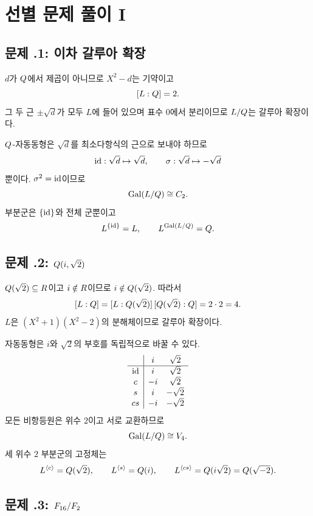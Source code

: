 \section{선별 문제 풀이 I}
\label{sec:galois-gateway-solutions-a}

\subsection*{문제 \thechapter.1: 이차 갈루아 확장}

\begin{solution}
$d$가 $Q$에서 제곱이 아니므로 $X^2-d$는 기약이고
\[
  [L:Q]=2.
\]
그 두 근 $\pm\sqrt d$가 모두 $L$에 들어 있으며 표수 $0$에서 분리이므로 $L/Q$는 갈루아 확장이다.

$Q$-자동동형은 $\sqrt d$를 최소다항식의 근으로 보내야 하므로
\[
  \operatorname{id}:\sqrt d\mapsto\sqrt d,
  \qquad
  \sigma:\sqrt d\mapsto-\sqrt d
\]
뿐이다. $\sigma^2=\operatorname{id}$이므로
\[
  \operatorname{Gal}(L/Q)\cong C_2.
\]
부분군은 $\{\operatorname{id}\}$와 전체 군뿐이고
\[
  L^{\{\operatorname{id}\}}=L,
  \qquad
  L^{\operatorname{Gal}(L/Q)}=Q.
\]
\end{solution}

\subsection*{문제 \thechapter.2: $Q(i,\sqrt2)$}

\begin{solution}
$Q(\sqrt2)\subseteq R$이고 $i\notin R$이므로 $i\notin Q(\sqrt2)$. 따라서
\[
  [L:Q]
  =[L:Q(\sqrt2)]\,[Q(\sqrt2):Q]
  =2\cdot2=4.
\]
$L$은 $(X^2+1)(X^2-2)$의 분해체이므로 갈루아 확장이다.

자동동형은 $i$와 $\sqrt2$의 부호를 독립적으로 바꿀 수 있다.
\[
\begin{array}{c|cc}
 & i & \sqrt2\\
\hline
\operatorname{id}&i&\sqrt2\\
c&-i&\sqrt2\\
s&i&-\sqrt2\\
cs&-i&-\sqrt2
\end{array}
\]
모든 비항등원은 위수 $2$이고 서로 교환하므로
\[
  \operatorname{Gal}(L/Q)\cong V_4.
\]
세 위수 $2$ 부분군의 고정체는
\[
  L^{\langle c\rangle}=Q(\sqrt2),
  \qquad
  L^{\langle s\rangle}=Q(i),
  \qquad
  L^{\langle cs\rangle}=Q(i\sqrt2)=Q(\sqrt{-2}).
\]
\end{solution}

\subsection*{문제 \thechapter.3: $F_{16}/F_2$}

